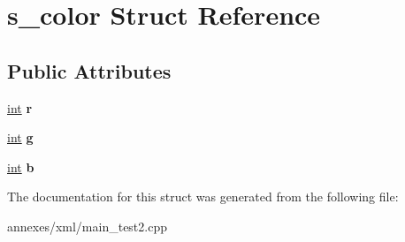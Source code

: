 \hypertarget{structs__color}{}\section{s\+\_\+color Struct Reference}
\label{structs__color}
\subsection*{Public Attributes}
\begin{DoxyCompactItemize}
\item 
\hypertarget{structs__color_a251e854381c6945efbbffc33796e6035}{}\hyperlink{_s_d_l__thread_8h_a6a64f9be4433e4de6e2f2f548cf3c08e}{int} {\bfseries r}\label{structs__color_a251e854381c6945efbbffc33796e6035}

\item 
\hypertarget{structs__color_a6d246ab8c311f6f86da2f9aa129b98d9}{}\hyperlink{_s_d_l__thread_8h_a6a64f9be4433e4de6e2f2f548cf3c08e}{int} {\bfseries g}\label{structs__color_a6d246ab8c311f6f86da2f9aa129b98d9}

\item 
\hypertarget{structs__color_a0710590bfa61f9db131e534589070ac8}{}\hyperlink{_s_d_l__thread_8h_a6a64f9be4433e4de6e2f2f548cf3c08e}{int} {\bfseries b}\label{structs__color_a0710590bfa61f9db131e534589070ac8}

\end{DoxyCompactItemize}


The documentation for this struct was generated from the following file\+:\begin{DoxyCompactItemize}
\item 
annexes/xml/main\+\_\+test2.\+cpp\end{DoxyCompactItemize}
